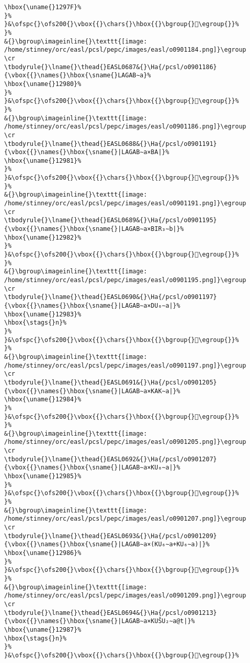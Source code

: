 \begin{verbatim}
\hbox{\uname{}1297F}%
}%
}&\ofspc{}\ofs200{}\vbox{{}\chars{}\hbox{{}\bgroup{}𒥿\egroup{}}%
}%
&{}\bgroup\imageinline{}\texttt{[image: /home/stinney/orc/easl/pcsl/pepc/images/easl/o0901184.png]}\egroup
\cr
\tbodyrule{}\lname{}\thead{}EASL0687&{}\Ha{/pcsl/o0901186}{\vbox{{}\names{}\hbox{\sname{}LAGAB∼a}%
\hbox{\uname{}12980}%
}%
}&\ofspc{}\ofs200{}\vbox{{}\chars{}\hbox{{}\bgroup{}𒦀\egroup{}}%
}%
&{}\bgroup\imageinline{}\texttt{[image: /home/stinney/orc/easl/pcsl/pepc/images/easl/o0901186.png]}\egroup
\cr
\tbodyrule{}\lname{}\thead{}EASL0688&{}\Ha{/pcsl/o0901191}{\vbox{{}\names{}\hbox{\sname{}|LAGAB∼a×BA|}%
\hbox{\uname{}12981}%
}%
}&\ofspc{}\ofs200{}\vbox{{}\chars{}\hbox{{}\bgroup{}𒦁\egroup{}}%
}%
&{}\bgroup\imageinline{}\texttt{[image: /home/stinney/orc/easl/pcsl/pepc/images/easl/o0901191.png]}\egroup
\cr
\tbodyrule{}\lname{}\thead{}EASL0689&{}\Ha{/pcsl/o0901195}{\vbox{{}\names{}\hbox{\sname{}|LAGAB∼a×BIR₃∼b|}%
\hbox{\uname{}12982}%
}%
}&\ofspc{}\ofs200{}\vbox{{}\chars{}\hbox{{}\bgroup{}𒦂\egroup{}}%
}%
&{}\bgroup\imageinline{}\texttt{[image: /home/stinney/orc/easl/pcsl/pepc/images/easl/o0901195.png]}\egroup
\cr
\tbodyrule{}\lname{}\thead{}EASL0690&{}\Ha{/pcsl/o0901197}{\vbox{{}\names{}\hbox{\sname{}|LAGAB∼a×DU₆∼a|}%
\hbox{\uname{}12983}%
\hbox{\stags{}n}%
}%
}&\ofspc{}\ofs200{}\vbox{{}\chars{}\hbox{{}\bgroup{}𒦃\egroup{}}%
}%
&{}\bgroup\imageinline{}\texttt{[image: /home/stinney/orc/easl/pcsl/pepc/images/easl/o0901197.png]}\egroup
\cr
\tbodyrule{}\lname{}\thead{}EASL0691&{}\Ha{/pcsl/o0901205}{\vbox{{}\names{}\hbox{\sname{}|LAGAB∼a×KAK∼a|}%
\hbox{\uname{}12984}%
}%
}&\ofspc{}\ofs200{}\vbox{{}\chars{}\hbox{{}\bgroup{}𒦄\egroup{}}%
}%
&{}\bgroup\imageinline{}\texttt{[image: /home/stinney/orc/easl/pcsl/pepc/images/easl/o0901205.png]}\egroup
\cr
\tbodyrule{}\lname{}\thead{}EASL0692&{}\Ha{/pcsl/o0901207}{\vbox{{}\names{}\hbox{\sname{}|LAGAB∼a×KU₆∼a|}%
\hbox{\uname{}12985}%
}%
}&\ofspc{}\ofs200{}\vbox{{}\chars{}\hbox{{}\bgroup{}𒦅\egroup{}}%
}%
&{}\bgroup\imageinline{}\texttt{[image: /home/stinney/orc/easl/pcsl/pepc/images/easl/o0901207.png]}\egroup
\cr
\tbodyrule{}\lname{}\thead{}EASL0693&{}\Ha{/pcsl/o0901209}{\vbox{{}\names{}\hbox{\sname{}|LAGAB∼a×(KU₆∼a+KU₆∼a)|}%
\hbox{\uname{}12986}%
}%
}&\ofspc{}\ofs200{}\vbox{{}\chars{}\hbox{{}\bgroup{}𒦆\egroup{}}%
}%
&{}\bgroup\imageinline{}\texttt{[image: /home/stinney/orc/easl/pcsl/pepc/images/easl/o0901209.png]}\egroup
\cr
\tbodyrule{}\lname{}\thead{}EASL0694&{}\Ha{/pcsl/o0901213}{\vbox{{}\names{}\hbox{\sname{}|LAGAB∼a×KUŠU₂∼a@t|}%
\hbox{\uname{}12987}%
\hbox{\stags{}n}%
}%
}&\ofspc{}\ofs200{}\vbox{{}\chars{}\hbox{{}\bgroup{}𒦇\egroup{}}%

\end{verbatim}
